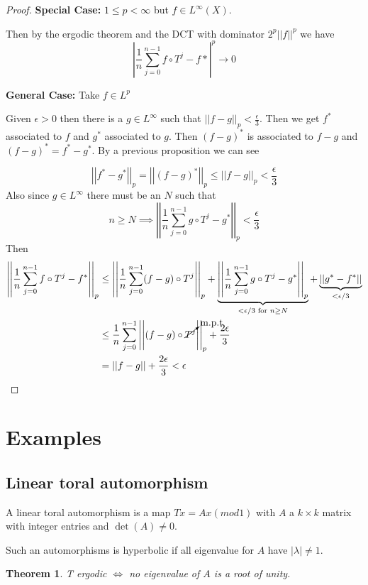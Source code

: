 \documentclass[11pt]{article}
\newcommand{\abs}[1]{\left|#1\right|}
\newcommand{\norm}[1]{\left|\left|#1\right|\right|}
\newenvironment{defin}
	{\begin{mdframed}[backgroundcolor=white, roundcorner=5pt, linewidth=1pt]}
	{\end{mdframed}}
\newcommand{\mdf}[1]{{\color{red} #1}}
\newtheorem{theorem}[prop]{Theorem}
\begin{document}
\begin{proof}
\textbf{Special Case: }$1\leq p < \infty$ but $f\in L^\infty(X)$.

Then by the ergodic theorem and the DCT with dominator $2^p\norm{f}^p$ we have
\[
	\abs{\frac{1}{n}\sum_{j=0}^{n-1}f\circ T^j - f*}^p \to 0
\]

\textbf{General Case: }Take $f\in L^p$

Given $\epsilon >0$ then there is a $g\in L^\infty$ such that $\norm{f-g}_p < \frac{\epsilon}{3}$.
Then we get $f^\ast$ associated to $f$ and $g^\ast$ associated to $g$.
Then $(f-g)^\ast$ is associated to $f-g$ and $(f-g)^\ast=f^\ast - g^\ast$.
By a previous proposition we can see

\[
	\norm{f^\ast-g^\ast}_p = \norm{(f-g)^\ast}_p \leq \norm{f-g}_p < \frac{\epsilon}{3}
\]
Also since $g\in L^\infty$ there must be an $N$ such that
\[
	n\geq N \implies \norm{\frac{1}{n}\sum_{j=0}^{n-1}g\circ T^j - g^\ast}_p < \frac{\epsilon}{3}
\]
Then
\begin{align*}
	\norm{\frac{1}{n}\sum_{j=0}^{n-1}f\circ T^j - f^\ast}_p & \leq \norm{\frac{1}{n}\sum_{j=0}^{n-1}(f-g)\circ T^j}_p +  \underbrace{\norm{\frac{1}{n}\sum_{j=0}^{n-1}g\circ T^j - g^\ast}_p}_{<\epsilon/3 \text{ for }n\geq N} + \underbrace{\norm{g^\ast - f^\ast}}_{<\epsilon/3} \\
															& \leq \frac{1}{n}\sum_{j=0}^{n-1}\norm{(f-g)\circ \cancelto{\text{m.p.t}}{T^j}}_p + \frac{2\epsilon}{3}\\
															& = \norm{f-g} + \frac{2\epsilon}{3} < \epsilon
\end{align*}
\end{proof}

\section{Examples}
\subsection{Linear toral automorphism}
\begin{defin}
A \mdf{linear toral automorphism} is a map $Tx=Ax (mod 1)$ with $A$ a $k\times k$ matrix with integer entries and $\det(A)\neq 0$.

Such an automorphisms is \mdf{hyperbolic} if all eigenvalue for $A$ have $|\lambda|\neq 1$.
\end{defin}
\begin{theorem}
T ergodic $\iff$ no eigenvalue of $A$ is a root of unity.
\end{theorem}
\end{document}
